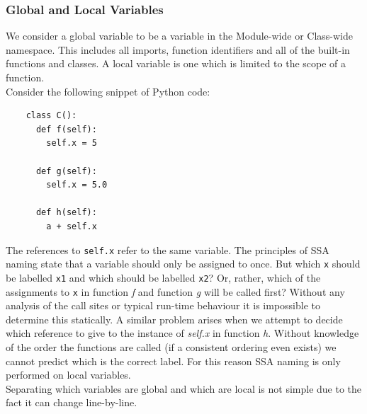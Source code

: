 \documentclass[12pt, titlepage]{article}
\begin{document}
\subsubsection{Global and Local Variables}
\label{chap:ssaGlobals}
We consider a global variable to be a variable in the Module-wide or Class-wide namespace. This includes all imports, function identifiers and all of the built-in functions and classes. A local variable is one which is limited to the scope of a function. \\
Consider the following snippet of Python code:
\begin{lstlisting}
    class C():
      def f(self):
        self.x = 5
     
      def g(self):
        self.x = 5.0         
        
      def h(self):
        a + self.x 
\end{lstlisting}
The references to \texttt{self.x} refer to the same variable. The principles of SSA naming state that a variable should only be assigned to once. But which \texttt{x} should be labelled \texttt{x1} and which should be labelled \texttt{x2}? Or, rather, which of the assignments to \texttt{x} in function \textit{f} and function \textit{g} will be called first? Without any analysis of the call sites or typical run-time behaviour it is impossible to determine this statically. A similar problem arises when we attempt to decide which reference to give to the instance of \textit{self.x} in function \textit{h}. Without knowledge of the order the functions are called (if a consistent ordering even exists) we cannot predict which is the correct label. For this reason SSA naming is only performed on local variables. \\
\indent Separating which variables are global and which are local is not simple due to the fact it can change line-by-line.
\end{document}

